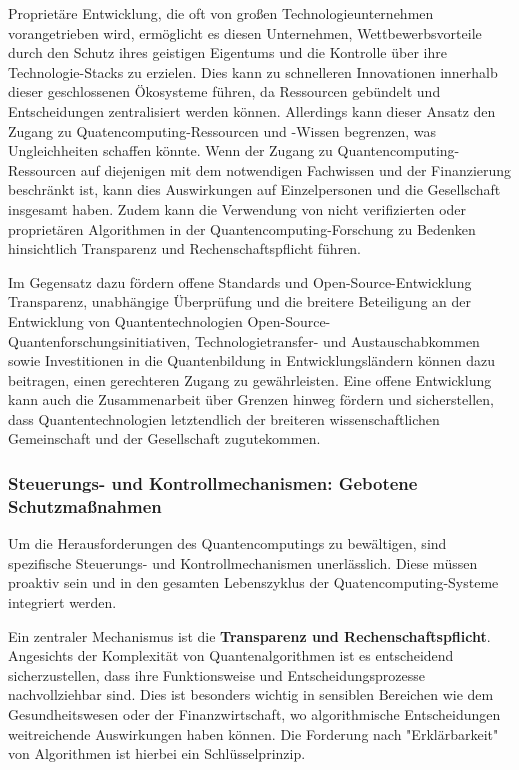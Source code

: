 Proprietäre Entwicklung, die oft von großen Technologieunternehmen vorangetrieben wird, ermöglicht es diesen Unternehmen, Wettbewerbsvorteile durch den Schutz ihres geistigen Eigentums und die Kontrolle über ihre Technologie-Stacks zu erzielen.\cite{noauthor_how_2025} Dies kann zu schnelleren Innovationen innerhalb dieser geschlossenen Ökosysteme führen, da Ressourcen gebündelt und Entscheidungen zentralisiert werden können. Allerdings kann dieser Ansatz den Zugang zu Quatencomputing-Ressourcen und -Wissen begrenzen, was Ungleichheiten schaffen könnte.\cite{liQuantumSupportVector2024} Wenn der Zugang zu Quantencomputing-Ressourcen auf diejenigen mit dem notwendigen Fachwissen und der Finanzierung beschränkt ist, kann dies Auswirkungen auf Einzelpersonen und die Gesellschaft insgesamt haben.\cite{noauthor_ethics_nodate} Zudem kann die Verwendung von nicht verifizierten oder proprietären Algorithmen in der Quantencomputing-Forschung zu Bedenken hinsichtlich Transparenz und Rechenschaftspflicht führen.\cite{noauthor_quantum_nodate-2}

Im Gegensatz dazu fördern offene Standards und Open-Source-Entwicklung Transparenz, unabhängige Überprüfung und die breitere Beteiligung an der Entwicklung von Quantentechnologien\cite{noauthor_quantum_nodate-1} Open-Source-Quantenforschungsinitiativen, Technologietransfer- und Austauschabkommen sowie Investitionen in die Quantenbildung in Entwicklungsländern können dazu beitragen, einen gerechteren Zugang zu gewährleisten.\cite{slu_telefonica_nodate} Eine offene Entwicklung kann auch die Zusammenarbeit über Grenzen hinweg fördern und sicherstellen, dass Quantentechnologien letztendlich der breiteren wissenschaftlichen Gemeinschaft und der Gesellschaft zugutekommen.


\subsubsection{\textbf{Steuerungs- und Kontrollmechanismen: Gebotene Schutzmaßnahmen}}
Um die Herausforderungen des Quantencomputings zu bewältigen, sind spezifische Steuerungs- und Kontrollmechanismen unerlässlich. Diese müssen proaktiv sein und in den gesamten Lebenszyklus der Quatencomputing-Systeme integriert werden.

Ein zentraler Mechanismus ist die \textbf{Transparenz und Rechenschaftspflicht}.\cite{noauthor_quantum_nodate-2} Angesichts der Komplexität von Quantenalgorithmen ist es entscheidend sicherzustellen, dass ihre Funktionsweise und Entscheidungsprozesse nachvollziehbar sind. Dies ist besonders wichtig in sensiblen Bereichen wie dem Gesundheitswesen oder der Finanzwirtschaft, wo algorithmische Entscheidungen weitreichende Auswirkungen haben können.\cite{noauthor_ethics_nodate-1} Die Forderung nach "Erklärbarkeit" von Algorithmen ist hierbei ein Schlüsselprinzip.

